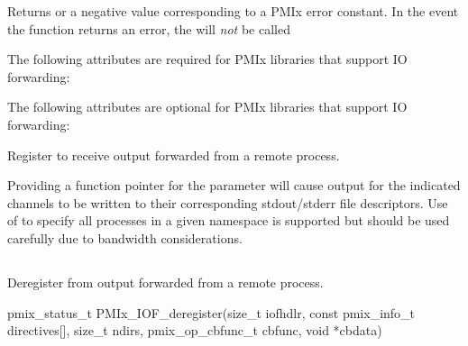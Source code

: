 Returns  or a negative value corresponding to a PMIx error constant. In the event the function returns an error, the  will \textit{not} be called

\reqattrstart
The following attributes are required for \ac{PMIx} libraries that support \ac{IO} forwarding:


\reqattrend

\optattrstart
The following attributes are optional for \ac{PMIx} libraries that support \ac{IO} forwarding:


\optattrend

\descr

Register to receive output forwarded from a remote process.

\adviceuserstart
Providing a  function pointer for the  parameter will cause output for the indicated channels to be written to their corresponding stdout/stderr file descriptors. Use of  to specify all processes in a given namespace is supported but should be used carefully due to bandwidth considerations.
\adviceuserend

\subsection{}

\summary

Deregister from output forwarded from a remote process.

\format

\cspecificstart
\begin{codepar}
pmix_status_t
PMIx_IOF_deregister(size_t iofhdlr,
                    const pmix_info_t directives[], size_t ndirs,
                    pmix_op_cbfunc_t cbfunc, void *cbdata)
\end{codepar}
\cspecificend

\begin{arglist}
\end{arglist}

